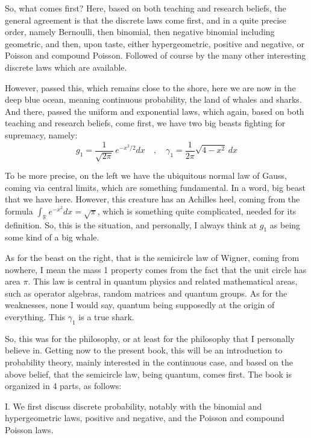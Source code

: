 \documentclass[12pt]{amsbook}
\begin{document}
\bigskip

So, what comes first? Here, based on both teaching and research beliefs, the general agreement is that the discrete laws come first, and in a quite precise order, namely Bernoulli, then binomial, then negative binomial including geometric, and then, upon taste, either hypergeometric, positive and negative, or Poisson and compound Poisson. Followed of course by the many other interesting discrete laws which are available.

\bigskip

However, passed this, which remains close to the shore, here we are now in the deep blue ocean, meaning continuous probability, the land of whales and sharks. And there, passed the uniform and exponential laws, which again, based on both teaching and research beliefs, come first, we have two big beasts fighting for supremacy, namely:
$$g_1=\frac{1}{\sqrt{2\pi}}\,e^{-x^2/2}dx\quad,\quad\gamma_1=\frac{1}{2\pi}\sqrt{4-x^2}\,dx$$

To be more precise, on the left we have the ubiquitous normal law of Gauss, coming via central limits, which are something fundamental. In a word, big beast that we have here. However, this creature has an Achilles heel, coming from the formula $\int_\mathbb Re^{-x^2}dx=\sqrt{\pi}$, which is something quite complicated, needed for its definition. So, this is the situation, and personally, I always think at $g_1$ as being some kind of a big whale.

\bigskip

As for the beast on the right, that is the semicircle law of Wigner, coming from nowhere, I mean the mass 1 property comes from the fact that the unit circle has area $\pi$. This law is central in quantum physics and related mathematical areas, such as operator algebras, random matrices and quantum groups. As for the weaknesses, none I would say, quantum being supposedly at the origin of everything. This $\gamma_1$ is a true shark.

\bigskip

So, this was for the philosophy, or at least for the philosophy that I personally believe in. Getting now to the present book, this will be an introduction to probability theory, mainly interested in the continuous case, and based on the above belief, that the semicircle law, being quantum, comes first. The book is organized in 4 parts, as follows:

\bigskip

I. We first discuss discrete probability, notably with the binomial and hypergeometric laws, positive and negative, and the Poisson and compound Poisson laws. 
\end{document}
